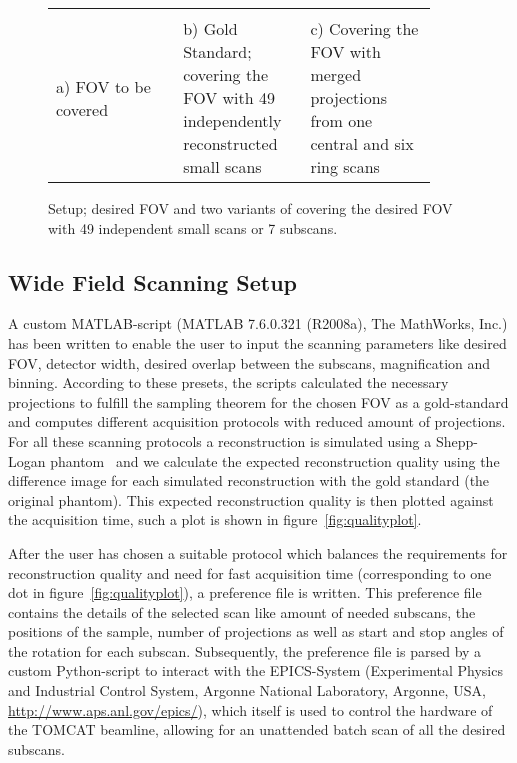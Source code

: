\begin{figure}%
	\centering%
	\caption{Setup; desired FOV and two variants of covering the desired FOV with 49 independent small scans or 7 subscans.}%
	\begin{tabular}{p{0.3\linewidth}p{0.3\linewidth}p{0.3\linewidth}}%
		 &%
		 &%
		 \\%
		a) FOV to be covered &%
		b) Gold Standard; covering the FOV with 49 independently reconstructed small scans &%
		c) Covering the FOV with merged projections from one central and six ring scans \\%
	\end{tabular}%
	\label{fig:Setup7SubScans}%
\end{figure}%

\subsection{Wide Field Scanning Setup}%
\label{subsec:wfs-setup}%
A custom MATLAB-script (MATLAB\textsuperscript{\textregistered} 7.6.0.321 (R2008a), The MathWorks, Inc.) has been written to enable the user to input the scanning parameters like desired FOV, detector width, desired overlap between the subscans, magnification and binning. According to these presets, the scripts calculated the necessary projections to fulfill the sampling theorem for the chosen FOV as a gold-standard and computes different acquisition protocols with reduced amount of projections. For all these scanning protocols a reconstruction is simulated using a Shepp-Logan phantom~\cite{Shepp1974} and we calculate the expected reconstruction quality using the difference image for each simulated reconstruction with the gold standard (the original phantom). This expected reconstruction quality is then plotted against the acquisition time, such a plot is shown in figure~\ref{fig:qualityplot}.

After the user has chosen a suitable protocol which balances the requirements for reconstruction quality and need for fast acquisition time (corresponding to one dot in figure~\ref{fig:qualityplot}), a preference file is written. This preference file contains the details of the selected scan like amount of needed subscans, the positions of the sample, number of projections as well as start and stop angles of the rotation for each subscan. Subsequently, the preference file is parsed by a custom Python-script to interact with the EPICS-System (Experimental Physics and Industrial Control System, Argonne National Laboratory, Argonne, USA, \url{http://www.aps.anl.gov/epics/}), which itself is used to control the hardware of the TOMCAT beamline, allowing for an unattended batch scan of all the desired subscans.

